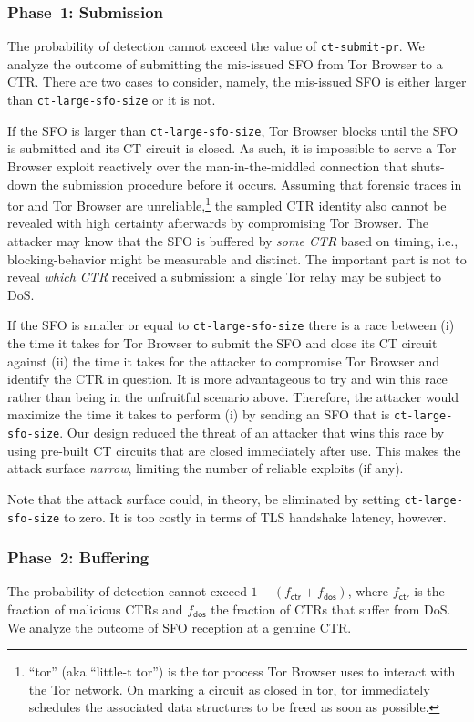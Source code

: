 \subsubsection{Phase~1: Submission} \label{sec:analysis:pr:phase1}
The probability of detection cannot exceed the value of \texttt{ct-submit-pr}.
We analyze the outcome of submitting the mis-issued SFO from Tor Browser to a
CTR.  There are two cases to consider, namely, the mis-issued SFO is either
larger than \texttt{ct-large-sfo-size} or it is not.

If the SFO is larger than \texttt{ct-large-sfo-size}, Tor Browser blocks until
the SFO is submitted and its CT circuit is closed.  As such, it is impossible to
serve a Tor Browser exploit reactively over the man-in-the-middled connection
that shuts-down the submission procedure before it occurs.  Assuming that
forensic traces in tor and Tor Browser are unreliable,\footnote{%
	``tor'' (aka ``little-t tor'') is the tor process Tor Browser uses to
	interact with the Tor network.  On marking a circuit as closed in tor, tor
	immediately schedules the associated data structures to be freed as soon as
	possible.
} the sampled CTR identity also cannot be revealed with high certainty
afterwards by compromising Tor Browser.  The attacker may know that the SFO is
buffered by \emph{some CTR} based on timing, i.e., blocking-behavior might be 
measurable and distinct.  The important part is not to reveal \emph{which CTR}
received a submission:  a single Tor relay may be subject to DoS.

If the SFO is smaller or equal to \texttt{ct-large-sfo-size} there is a
race between (i) the time it takes for Tor Browser to submit the SFO and close
its CT circuit against (ii) the time it takes for the attacker to compromise Tor
Browser and identify the CTR in question.  It is more advantageous to try and
win this race rather than being in the unfruitful scenario above.  Therefore,
the attacker would maximize the time it takes to perform (i) by sending an SFO
that is \texttt{ct-large-sfo-size}.  Our design reduced the threat of an
attacker that wins this race by using pre-built CT circuits that are closed
immediately after use.  This makes the attack surface \emph{narrow}, limiting
the number of reliable exploits (if any).

Note that the attack surface could, in theory, be eliminated by setting
\texttt{ct-large-sfo-size} to zero.  It is too costly in terms of TLS handshake
latency, however.

\subsubsection{Phase~2: Buffering} \label{sec:analysis:pr:phase2}
The probability of detection cannot exceed $1-(f_{\mathsf{ctr}} +
f_{\mathsf{dos}})$, where $f_{\mathsf{ctr}}$ is the fraction of
malicious CTRs and $f_{\mathsf{dos}}$ the fraction of CTRs that suffer from
DoS.  We analyze the outcome of SFO reception at a genuine CTR.

